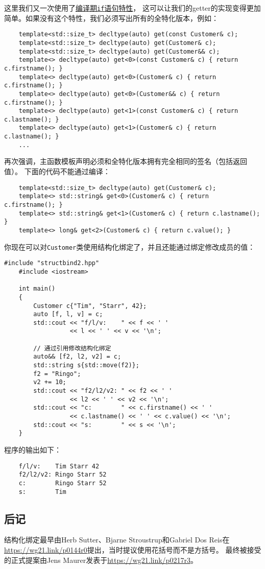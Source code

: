 这里我们又一次使用了\hyperref[ch10]{编译期\texttt{if}语句特性}，
这可以让我们的getter的实现变得更加简单。如果没有这个特性，我们必须写出所有的全特化版本，例如：
\begin{lstlisting}
    template<std::size_t> decltype(auto) get(const Customer& c);
    template<std::size_t> decltype(auto) get(Customer& c);
    template<std::size_t> decltype(auto) get(Customer&& c);
    template<> decltype(auto) get<0>(const Customer& c) { return c.firstname(); }
    template<> decltype(auto) get<0>(Customer& c) { return c.firstname(); }
    template<> decltype(auto) get<0>(Customer&& c) { return c.firstname(); }
    template<> decltype(auto) get<1>(const Customer& c) { return c.lastname(); }
    template<> decltype(auto) get<1>(Customer& c) { return c.lastname(); }
    ...
\end{lstlisting}
再次强调，主函数模板声明必须和全特化版本拥有完全相同的签名（包括返回值）。
下面的代码不能通过编译：
\begin{lstlisting}
    template<std::size_t> decltype(auto) get(Customer& c);
    template<> std::string& get<0>(Customer& c) { return c.firstname(); }
    template<> std::string& get<1>(Customer& c) { return c.lastname(); }
    template<> long& get<2>(Customer& c) { return c.value(); }
\end{lstlisting}
你现在可以对\texttt{Customer}类使用结构化绑定了，并且还能通过绑定修改成员的值：
\begin{lstlisting}[frame=single, title=lang/structbind2.cpp]
    #include "structbind2.hpp"
    #include <iostream>

    int main()
    {
        Customer c{"Tim", "Starr", 42};
        auto [f, l, v] = c;
        std::cout << "f/l/v:    " << f << ' '
                  << l << ' ' << v << '\n';

        // 通过引用修改结构化绑定
        auto&& [f2, l2, v2] = c;
        std::string s{std::move(f2)};
        f2 = "Ringo";
        v2 += 10;
        std::cout << "f2/l2/v2: " << f2 << ' '
                  << l2 << ' ' << v2 << '\n';
        std::cout << "c:        " << c.firstname() << ' '
                  << c.lastname() << ' ' << c.value() << '\n';
        std::cout << "s:        " << s << '\n';
    }
\end{lstlisting}
程序的输出如下：
\begin{lstlisting}
    f/l/v:    Tim Starr 42
    f2/l2/v2: Ringo Starr 52
    c:        Ringo Starr 52
    s:        Tim
\end{lstlisting}

\subsection{后记}
结构化绑定最早由Herb Sutter、Bjarne Stroustrup和Gabriel Dos Reis在
\url{https://wg21.link/p0144r0}提出，当时提议使用花括号而不是方括号。
最终被接受的正式提案由Jens Maurer发表于\url{https://wg21.link/p0217r3}。
